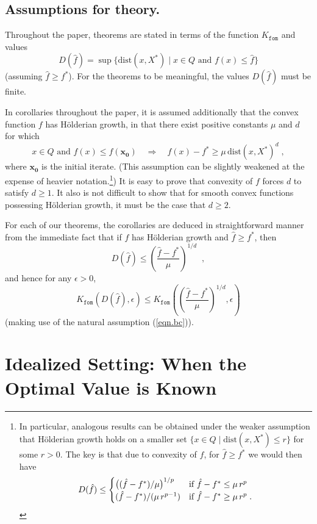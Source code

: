 \documentclass[reqno, 11pt]{amsart}
\numberwithin{equation}{section}
\newcommand{\shrink}[1]{ {\scriptstyle {\textstyle {#1} } } }
\newcommand{\smfrac}[2]{ \shrink{ \frac{#1}{#2} } }
\newcommand{\fom}{\mathtt{fom}}
\newcommand{\dist}{\mathrm{dist}}
\begin{document}
    
\subsection{Assumptions for theory.} \label{sect.bb}
Throughout the paper, theorems are stated in terms of the function $ K_{\fom} $ and values
\[ 
 D(\hat{f}) = \sup \{ \dist(x,X^*) \mid  x \in Q  \textrm{ and } f(x) \leq \hat{f} \} 
\] 
(assuming $ \hat{f} \geq f^* $). For the theorems to be meaningful, the values $ D( \hat{f}) $ must be finite.

In corollaries throughout the paper, it is assumed additionally that the convex function $ f $ has H\"{o}lderian growth, in that there exist positive constants $ \mu $  and $ d  $ for which
\[  
   x \in Q \textrm{ and } f(x) \leq f( \mathbf{x_0})  \quad \Rightarrow \quad f(x) - f^* \geq \mu \,  \dist(x,X^*)^d \; ,
\] 
where $ \mathbf{x_0} $ is the initial iterate.  (This assumption can be slightly weakened at the expense of heavier notation.\footnote{In particular, analogous results can be obtained under the weaker assumption that  H\"{o}lderian growth holds on a smaller set $ \{ x \in Q \mid \dist(x,X^*) \leq r \} $ for some $ r > 0 $. The key is that due to convexity of $ f $, for $ \hat{f} \geq f^* $ we would then have 
\[     D( \hat{f})  \leq  \begin{cases}  \big( (\hat{f} - f^*)/\mu  \big)^{1/p} & \textrm{if $ \hat{f} - f^* \leq \mu \, r^p $} \\
(\hat{f} - f^*)/(\mu \, r^{p-1}) & \textrm{if $ \hat{f} - f^* \geq \mu \, r^p $} \; .        
\end{cases}    \]}) It is easy to prove that convexity of $ f $ forces $ d $ to satisfy $ d \geq 1 $. It also is not difficult to show that for smooth convex functions possessing H\"{o}lderian growth, it must be the case that $ d \geq 2 $.

For each of our theorems, the corollaries are deduced in straightforward manner from  the immediate fact that if $ f $ has H\"{o}lderian growth and $ \hat{f} \geq f^* $, then 
\[ 
  D(\hat{f}) \leq  \left( \smfrac{\hat{f} - f^*}{\mu} \right)^{1/d} \; \; , \]
and hence for any $ \epsilon > 0 $,    
\begin{equation} \label{eqn.bj} 
  K_{\fom}( D( \hat{f}), \epsilon) \leq K_{\fom} \left( \left( \smfrac{\hat{f} - f^*}{\mu} \right)^{1/d}, \epsilon \right)  
  \end{equation}
  (making use of the natural assumption (\ref{eqn.bc})).
 
\section{{\bf Idealized Setting: When the Optimal Value is Known}} \label{sect.c} 
\end{document}
